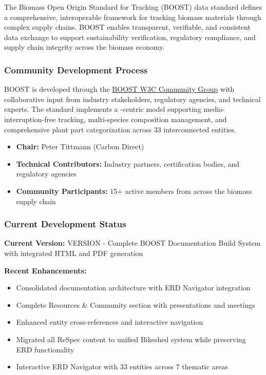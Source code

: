 
The Biomass Open Origin Standard for Tracking (BOOST) data standard defines a comprehensive, interoperable framework for tracking biomass materials through complex supply chains. BOOST enables transparent, verifiable, and consistent data exchange to support sustainability verification, regulatory compliance, and supply chain integrity across the biomass economy.

\subsubsection{Community Development Process}
\label{sec:community-development-process}

BOOST is developed through the \href{https://www.w3.org/community/boost-01/}{BOOST W3C Community Group} with collaborative input from industry stakeholders, regulatory agencies, and technical experts. The standard implements a \TRU-centric model supporting media-interruption-free tracking, multi-species composition management, and comprehensive plant part categorization across 33 interconnected entities.

\begin{informative}[title=Working Group Leadership]
\begin{itemize}
    \item \textbf{Chair:} Peter Tittmann (Carbon Direct)
    \item \textbf{Technical Contributors:} Industry partners, certification bodies, and regulatory agencies  
    \item \textbf{Community Participants:} 15+ active members from across the biomass supply chain
\end{itemize}
\end{informative}

\subsubsection{Current Development Status}
\label{sec:development-status}

\begin{important}[title=Current Version Information]
\textbf{Current Version:} {{VERSION}} - Complete BOOST Documentation Build System with integrated HTML and PDF generation

\textbf{Recent Enhancements:}
\begin{itemize}
    \item Consolidated documentation architecture with ERD Navigator integration
    \item Complete Resources \& Community section with presentations and meetings
    \item Enhanced entity cross-references and interactive navigation  
    \item Migrated all ReSpec content to unified Bikeshed system while preserving ERD functionality
    \item Interactive ERD Navigator with 33 entities across 7 thematic areas
\end{itemize}
\end{important}


